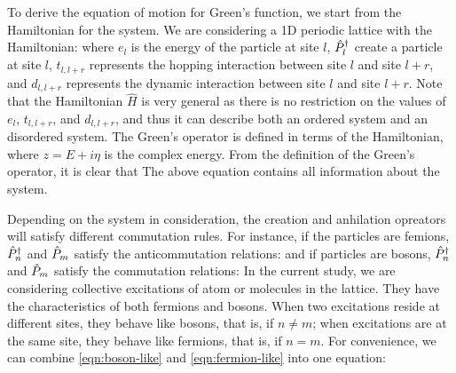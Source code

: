 To derive the equation of motion for Green's function, we start from the Hamiltonian for the system. We are 
considering a 1D periodic lattice with the Hamiltonian:
where $e_l$ is the energy of the particle at site $l$, $\hat{P}^{\dagger}_{l}$ create a particle at site $l$, $t_{l, l+r}$ represents the hopping interaction between
site $l$ and site $l+r$, and $d_{l, l+r}$ represents the dynamic interaction between
site $l$ and site $l+r$. Note that the Hamiltonian $\hat{H}$ is very general as there is no restriction on the values 
of $e_l$, $t_{l, l+r}$, and $d_{l, l+r}$, and thus it can describe both an ordered system and an 
disordered system. The Green's operator is defined in terms of the Hamiltonian,
where $z = E + i\eta$ is the complex energy. From the definition of the Green's operator, it is clear that  
The above equation contains all information about the system. 

Depending on the system in consideration, the creation and anhilation opreators will satisfy different commutation
rules. For instance, if the particles are femions, $\hat{P}^{\dagger}_{n}$ and $\hat{P}_{m}$ satisfy the anticommutation relations:
and if particles are bosons, $\hat{P}^{\dagger}_{n}$ and $\hat{P}_{m}$ satisfy the commutation relations:
In the current study, we are considering collective excitations of atom or molecules in the lattice. They have the 
characteristics of both fermions and bosons. When two excitations reside at different sites, they behave like
bosons, that is,
if $n \neq m$; when excitations are at the same site, they behave like fermions, that is,
if $n = m$. For convenience, we can combine \autoref{eqn:boson-like} and \autoref{eqn:fermion-like} into one equation:

